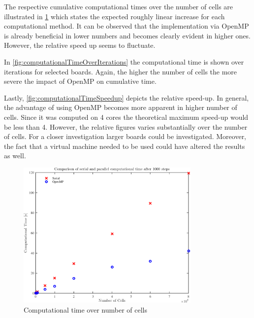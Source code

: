 \smallskip

The respective cumulative computational times over the number of cells are illustrated in \cref{fig:computationalTimeOverCells} which states the expected roughly linear increase for each computational method. It can be observed that the implementation via OpenMP is already beneficial in lower numbers and becomes clearly evident in higher ones. However, the relative speed up seems to fluctuate.

\smallskip

In \cref{fig:computationalTimeOverIterations} the computational time is shown over iterations for selected boards. Again, the higher the number of cells the more severe the impact of OpenMP on cumulative time.

\smallskip

Lastly, \cref{fig:computationalTimeSpeedup} depicts the relative speed-up. In general, the advantage of using OpenMP becomes more apparent in higher number of cells. Since it was computed on 4 cores the theoretical maximum speed-up would be less than 4. However, the relative figures varies substantially over the number of cells. For a closer investigation larger boards could be investigated. Moreover, the fact that a virtual machine needed to be used could have altered the results as well.

\begin{figure}\centering
	\includegraphics[width=0.8\textwidth]{figures/SerialOpenMP_Cells.pdf}
	\caption{Computational time over number of cells}
	\label{fig:computationalTimeOverCells}
\end{figure}

